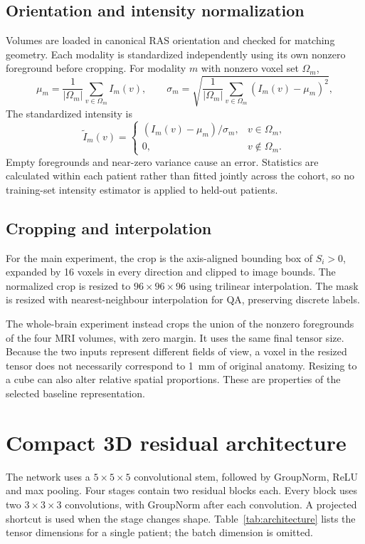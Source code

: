 \documentclass[12pt,a4paper,oneside]{report}
\newcommand{\roi}{\ensuremath{96\times96\times96}}
\begin{document}
\subsection{Orientation and intensity normalization}
Volumes are loaded in canonical RAS orientation and checked for matching geometry. Each modality is standardized independently using its own nonzero foreground before cropping. For modality $m$ with nonzero voxel set $\Omega_m$,
\begin{equation}
\mu_m=\frac{1}{|\Omega_m|}\sum_{v\in\Omega_m}I_m(v),\qquad
\sigma_m=\sqrt{\frac{1}{|\Omega_m|}\sum_{v\in\Omega_m}(I_m(v)-\mu_m)^2},
\end{equation}
The standardized intensity is
\begin{equation}
\widetilde I_m(v)=\begin{cases}(I_m(v)-\mu_m)/\sigma_m,&v\in\Omega_m,\\0,&v\notin\Omega_m.\end{cases}
\end{equation}
Empty foregrounds and near-zero variance cause an error. Statistics are calculated within each patient rather than fitted jointly across the cohort, so no training-set intensity estimator is applied to held-out patients.

\subsection{Cropping and interpolation}
For the main experiment, the crop is the axis-aligned bounding box of $S_i>0$, expanded by 16 voxels in every direction and clipped to image bounds. The normalized crop is resized to \roi{} using trilinear interpolation. The mask is resized with nearest-neighbour interpolation for QA, preserving discrete labels.

The whole-brain experiment instead crops the union of the nonzero foregrounds of the four MRI volumes, with zero margin. It uses the same final tensor size. Because the two inputs represent different fields of view, a voxel in the resized tensor does not necessarily correspond to 1~mm of original anatomy. Resizing to a cube can also alter relative spatial proportions. These are properties of the selected baseline representation.

\section{Compact 3D residual architecture}
The network uses a $5\times5\times5$ convolutional stem, followed by GroupNorm, ReLU and max pooling. Four stages contain two residual blocks each. Every block uses two $3\times3\times3$ convolutions, with GroupNorm after each convolution. A projected shortcut is used when the stage changes shape. Table~\ref{tab:architecture} lists the tensor dimensions for a single patient; the batch dimension is omitted.
\end{document}

